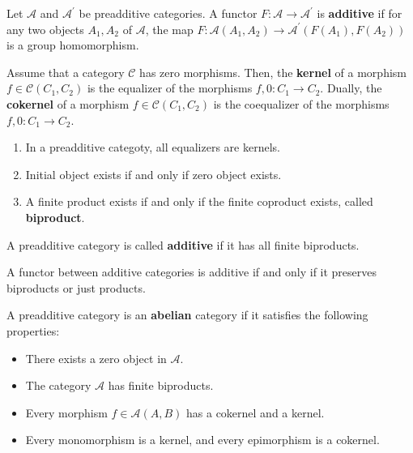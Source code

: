 Let $\mathcal{A}$ and $\mathcal{A}^{\prime}$ be preadditive categories. A functor $F: \mathcal{A} \rightarrow \mathcal{A}^{\prime}$ is \textbf{additive} if for any two objects $A_1, A_2$ of $\mathcal{A}$, the map $F: \mathcal{A}\left(A_1, A_2\right) \rightarrow \mathcal{A}^{\prime}\left(F\left(A_1\right), F\left(A_2\right)\right)$ is a group homomorphism.

Assume that a category $\mathcal{C}$ has zero morphisms. Then, the \textbf{kernel} of a morphism $f \in \mathcal{C}\left(C_1, C_2\right)$ is the equalizer of the morphisms $f, 0: C_1 \rightarrow C_2$. Dually, the \textbf{cokernel} of a morphism $f \in \mathcal{C}\left(C_1, C_2\right)$ is the coequalizer of the morphisms $f, 0: C_1 \rightarrow C_2$.

\begin{prop}
    \begin{enumerate}
        \item In a preadditive categoty, all equalizers are kernels.
        \item Initial object exists if and only if zero object exists.
        \item A finite product exists if and only if the finite coproduct exists, called \textbf{biproduct}.
    \end{enumerate}
\end{prop}

A preadditive category is called \textbf{additive} if it has all finite biproducts.\\

\begin{prop}
A functor between additive categories is additive if and only if it preserves biproducts or just products.
\end{prop}

A preadditive category is an \textbf{abelian} category if it satisfies the following properties: 
\begin{itemize}
    \item There exists a zero object in $\mathcal{A}$.
    \item The category $\mathcal{A}$ has finite biproducts.
    \item Every morphism $f \in \mathcal{A}(A, B)$ has a cokernel and a kernel.
    \item Every monomorphism is a kernel, and every epimorphism is a cokernel.
\end{itemize}

